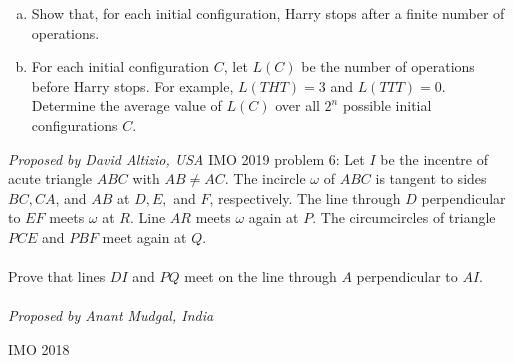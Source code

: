 \begin{enumerate}[(a)]
  \item Show that, for each initial configuration, Harry stops after a finite number of operations.
  \item For each initial configuration $C$, let $L(C)$ be the number of operations before Harry stops. For example, $L(THT) = 3$ and $L(TTT) = 0$. Determine the average value of $L(C)$ over all $2^n$ possible initial configurations $C$.
\end{enumerate}
\textit{Proposed by David Altizio, USA} 
IMO 2019 problem 6:  Let $I$ be the incentre of acute triangle $ABC$ with $AB\neq AC$. The incircle $\omega$ of $ABC$ is tangent to sides $BC, CA$, and $AB$ at $D, E,$ and $F$, respectively. The line through $D$ perpendicular to $EF$ meets $\omega$ at $R$. Line $AR$ meets $\omega$ again at $P$. The circumcircles of triangle $PCE$ and $PBF$ meet again at $Q$. \\\\
Prove that lines $DI$ and $PQ$ meet on the line through $A$ perpendicular to $AI$. \\\\
\textit{Proposed by Anant Mudgal, India} 

IMO 2018 

